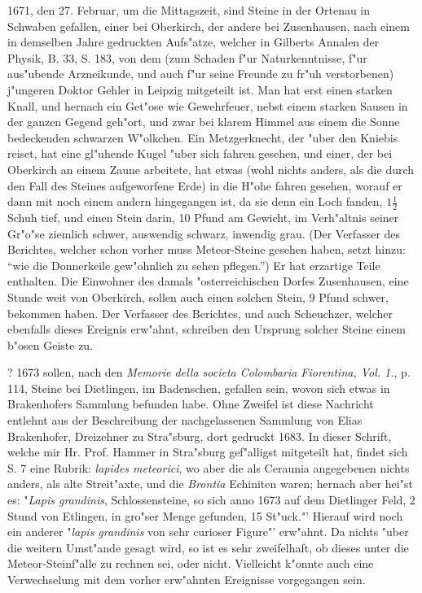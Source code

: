 \documentclass[a4paper, 11pt, oneside, polutonikogreek, german]{article}
\begin{document}
1671, den 27. Februar, um die Mittagszeit, sind Steine in der Ortenau in Schwaben gefallen, einer bei Oberkirch, der andere bei Zusenhausen, nach einem in demselben Jahre gedruckten Aufs"atze, welcher in Gilberts Annalen der Physik, B. 33, S. 183, von dem (zum Schaden f"ur Naturkenntnisse, f"ur aus"ubende Arzneikunde, und auch f"ur seine Freunde zu fr"uh verstorbenen) j"ungeren Doktor Gehler in Leipzig mitgeteilt ist. Man hat erst einen starken Knall, und hernach ein Get"ose wie Gewehrfeuer, nebst einem starken Sausen in der ganzen Gegend geh"ort, und zwar bei klarem Himmel aus einem die Sonne bedeckenden schwarzen W"olkchen. Ein Metzgerknecht, der "uber den Kniebis reiset, hat eine gl"uhende Kugel "uber sich fahren gesehen, und einer, der bei Oberkirch an einem Zaune arbeitete, hat etwas (wohl nichts anders, als die durch den Fall des Steines aufgeworfene Erde) in die H"ohe fahren gesehen, worauf er dann mit noch einem andern hingegangen ist, da sie denn ein Loch fanden, $\mathfrak{1\frac{1}{2}}$ Schuh tief, und einen Stein darin, 10 Pfund am Gewicht, im Verh"altnis seiner Gr"o"se ziemlich schwer, auswendig schwarz, inwendig grau. (Der Verfasser des Berichtes, welcher schon vorher muss Meteor-Steine gesehen haben, setzt hinzu: "`wie die Donnerkeile gew"ohnlich zu sehen pflegen."') Er hat erzartige Teile enthalten. Die Einwohner des damals "osterreichischen Dorfes Zusenhausen, eine Stunde weit von Oberkirch, sollen auch einen solchen Stein, 9 Pfund schwer, bekommen haben. Der Verfasser des Berichtes, und auch Scheuchzer, welcher ebenfalls dieses Ereignis erw"ahnt, schreiben den Ursprung solcher Steine einem b"osen Geiste zu.

? 1673 sollen, nach den \emph{Memorie della societa Colombaria Fiorentina, Vol. 1.}, p. 114, Steine bei Dietlingen, im Badenschen, gefallen sein, wovon sich etwas in Brakenhofers Sammlung befunden habe. Ohne Zweifel ist diese Nachricht entlehnt aus der Beschreibung der nachgelassenen Sammlung von Elias Brakenhofer, Dreizehner zu Stra"sburg, dort gedruckt 1683. In dieser Schrift, welche mir Hr. Prof. Hammer in Stra"sburg gef"alligst mitgeteilt hat, findet sich S. 7 eine Rubrik: \emph{lapides meteorici}, wo aber die als Ceraunia angegebenen nichts anders, als alte Streit"axte, und die \emph{Brontia} Echiniten waren; hernach aber hei"st es: "\emph{Lapis grandinis}, Schlossensteine, so sich anno 1673 auf dem Dietlinger Feld, 2 Stund von Etlingen, in gro"ser Menge gefunden, 15 St"uck."' Hierauf wird noch ein anderer "\emph{lapis grandinis} von sehr curioser Figure"' erw"ahnt. Da nichts "uber die weitern Umst"ande gesagt wird, so ist es sehr zweifelhaft, ob dieses unter die Meteor-Steinf"alle zu rechnen sei, oder nicht. Vielleicht k"onnte auch eine Verwechselung mit dem vorher erw"ahnten Ereignisse vorgegangen sein.
\end{document}

